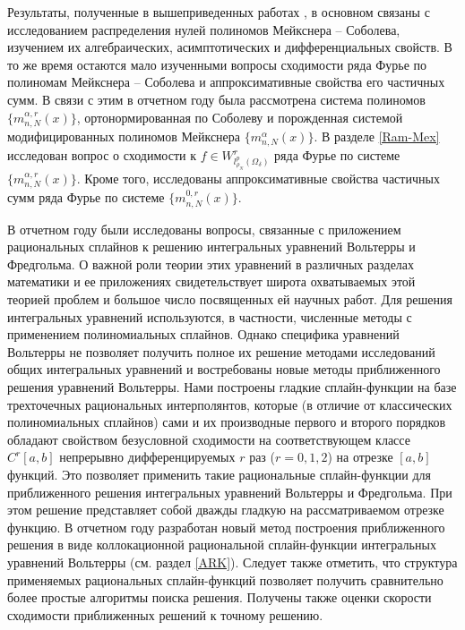Результаты, полученные в вышеприведенных работах \cite{Ram-Shar-VMJ, Ram-Ar-Go-Mar, Ram-Kh-Old, Ram-Bav1, Ram-Bav2, Ram-Shar-Sar, Ram-Mor-Bal, Ram-Co-So-Vil}, в основном связаны с исследованием распределения нулей полиномов Мейкснера --  Соболева, изучением их алгебраических, асимптотических и дифференциальных свойств. В то же время остаются мало изученными вопросы сходимости ряда Фурье по полиномам Мейкснера -- Соболева и аппроксимативные свойства его частичных сумм. В связи с этим в отчетном году была рассмотрена система полиномов $\{m_{n,N}^{\alpha,r}(x)\}$, ортонормированная по Соболеву и порожденная системой модифицированных полиномов Мейкснера $\{m_{n,N}^{\alpha}(x)\}$. В разделе \ref{Ram-Mex} исследован вопрос о сходимости к $f\in W^r_{l^p_{\rho_N}(\Omega_\delta)}$ ряда Фурье по системе $\{m_{n,N}^{\alpha,r}(x)\}$. Кроме того, исследованы аппроксимативные свойства частичных сумм ряда Фурье по системе $\{m_{n,N}^{0,r}(x)\}$.

В отчетном году были исследованы вопросы, связанные с приложением рациональных сплайнов к решению интегральных уравнений Вольтерры и Фредгольма. О важной роли теории этих уравнений в различных разделах математики и ее приложениях свидетельствует широта охватываемых этой теорией проблем и большое число посвященных ей научных работ. Для решения интегральных уравнений используются, в частности, численные методы с применением полиномиальных сплайнов. Однако специфика уравнений Вольтерры не позволяет получить полное их решение методами исследований общих интегральных уравнений и востребованы новые методы приближенного решения уравнений Вольтерры.
Нами построены гладкие сплайн-функции на базе трехточечных рациональных
интерполянтов, которые (в отличие от классических полиномиальных сплайнов)
сами и их производные первого и второго
порядков обладают свойством безусловной сходимости
на соответствующем классе $C^r[a,b]$ непрерывно дифференцируемых $r$ раз
($r=0,1,2$) на отрезке $[a,b]$ функций.
Это позволяет применить такие рациональные сплайн-функции для приближенного
решения интегральных уравнений Вольтерры и Фредгольма.
При этом решение представляет собой дважды гладкую на рассматриваемом отрезке
функцию.
В отчетном году разработан новый метод построения приближенного решения в виде коллокационной рациональной сплайн-функции
интегральных уравнений Вольтерры (см. раздел \ref{ARK}). Следует также отметить, что структура применяемых рациональных сплайн-функций
позволяет получить сравнительно более простые алгоритмы поиска решения. Получены также оценки скорости сходимости приближенных решений к точному решению.

